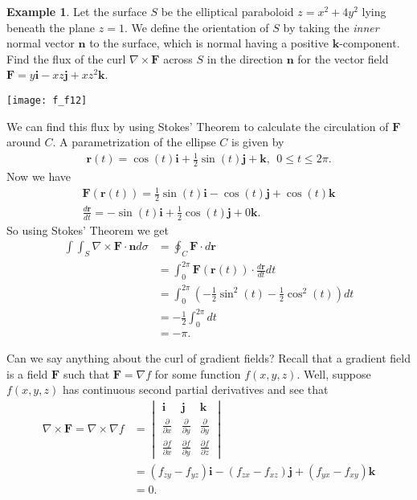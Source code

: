 \documentclass[12pt, letter]{article}
\theoremstyle{plain}
\numberwithin{theorem}{section}
\theoremstyle{definition}
\newtheorem{example}[theorem]{Example}
\begin{document}
\begin{example}
Let the surface $S$ be the elliptical paraboloid $z=x^2+4y^2$ lying beneath the plane $z=1$. We define the orientation of $S$ by taking the \textit{inner} normal vector $\bm{n}$ to the surface, which is normal having a positive $\bm{k}$-component. Find the flux of the curl $\nabla \times \bm{F}$ across $S$ in the direction $\bm{n}$ for the vector field $\bm{F}=y\bm{i}-xz\bm{j}+xz^2\bm{k}$.

\bigskip

\begin{center}
\texttt{[image: f\_f12]}
\end{center}

\bigskip

We can find this flux by using Stokes' Theorem to calculate the circulation of $\bm{F}$ around $C$. A parametrization of the ellipse $C$ is given by
\begin{align*}
\bm{r}(t) = \cos(t)\bm{i}+\frac{1}{2}\sin(t)\bm{j}+\bm{k}, \ \ 0\leq t \leq 2\pi.
\end{align*}
Now we have
\begin{align*}
\bm{F}(\bm{r}(t))=\frac{1}{2}\sin(t)\bm{i}-\cos(t)\bm{j}+\cos(t)\bm{k}\\
\frac{d\bm{r}}{dt}=-\sin(t)\bm{i}+\frac{1}{2}\cos(t)\bm{j}+0\bm{k}.
\end{align*}
So using Stokes' Theorem we get
\begin{align*}
\int\int_S \nabla \times \bm{F}\cdot\bm{n}d\sigma &= \oint_C \bm{F}\cdot d\bm{r}\\
&= \int_0^{2\pi} \bm{F}(\bm{r}(t)) \cdot \frac{d\bm{r}}{dt}{dt}\\
&= \int_0^{2\pi} \left(-\frac{1}{2}\sin^2(t)-\frac{1}{2}\cos^2(t)\right)dt\\
&=-\frac{1}{2}\int_0^{2\pi} dt\\
&=-\pi.
\end{align*}
\end{example}

\bigskip

\hrulefill

\bigskip

Can we say anything about the curl of gradient fields? Recall that a gradient field is a field $\bm{F}$ such that $\bm{F} = \nabla f$ for some function $f(x,y,z)$. Well, suppose $f(x,y,z)$ has continuous second partial derivatives and see that
\begin{align*}
\nabla \times \bm{F} = \nabla \times \nabla f &= \begin{vmatrix} \bm{i} & \bm{j} & \bm{k} \\ \frac{\partial}{\partial x} & \frac{\partial}{\partial y} & \frac{\partial}{\partial y} \\ \frac{\partial f}{\partial x} & \frac{\partial f}{\partial y} & \frac{\partial f}{\partial z} \end{vmatrix}\\
&= (f_{zy}-f_{yz})\bm{i}-(f_{zx}-f_{xz})\bm{j}+(f_{yx}-f_{xy})\bm{k}\\
&= 0.
\end{align*}
\end{document}
